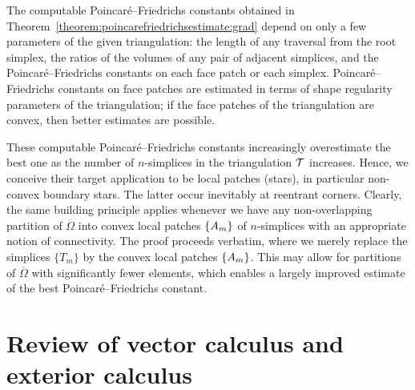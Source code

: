 \documentclass[10pt,a4paper]{article}
\begin{document}
\begin{remark}
    The computable Poincar\'e--Friedrichs constants obtained in Theorem~\ref{theorem:poincarefriedrichsestimate:grad} depend on only a few parameters of the given triangulation: 
    the length of any traversal from the root simplex, 
    the ratios of the volumes of any pair of adjacent simplices, 
    and the Poincar\'e--Friedrichs constants on each face patch or each simplex. 
    Poincar\'e--Friedrichs constants on face patches are estimated in terms of shape regularity parameters of the triangulation; 
    if the face patches of the triangulation are convex, then better estimates are possible. 
    
    These computable Poincar\'e--Friedrichs constants increasingly overestimate the best one as the number of $n$-simplices in the triangulation ${\mathcal T}$ increases. 
    Hence, we conceive their target application to be local patches (stars), in particular non-convex boundary stars. 
    The latter occur inevitably at reentrant corners. Clearly, the same building principle applies whenever we have any non-overlapping partition of $\overline \Omega$ into convex local patches $\{ A_m \}$ of $n$-simplices with an appropriate notion of connectivity. 
    The proof proceeds verbatim, where we merely replace the simplices $\{ T_{m} \}$ by the convex local patches $\{ A_m \}$. 
    This may allow for partitions of $\overline \Omega$ with significantly fewer elements, which enables a largely improved estimate of the best Poincar\'e--Friedrichs constant. 
\end{remark}



    






















\section{Review of vector calculus and exterior calculus}\label{section:calculus}
\end{document}
